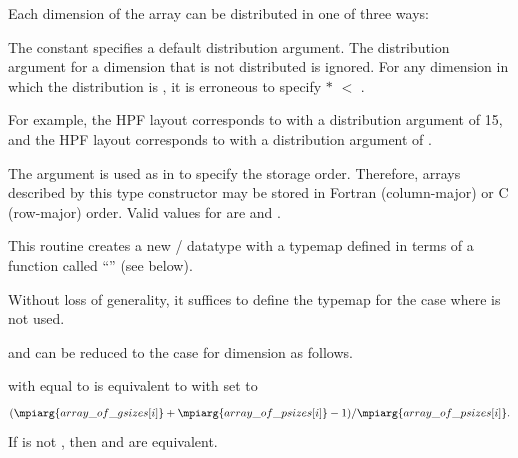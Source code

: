 Each dimension of the array
can be
distributed in one of three ways:
\begin{constlist}
\end{constlist}

The constant  specifies
a default distribution argument.
The distribution argument for a dimension that is not distributed
is ignored.
For any dimension
in which the distribution
is ,
it is erroneous
to specify
 $*$ 
$<$ .

For example, the HPF layout 
corresponds to 
with a distribution argument of 15, and the HPF layout \gb{}
corresponds to
 with a distribution argument of
.

The  argument is used as in  to
specify the storage order.
Therefore, arrays described by this type constructor may be
stored in Fortran (column-major) or C (row-major) order.
Valid values for  are
 and .

This routine creates a new \MPI/ datatype with a typemap defined in
terms of a function called ``'' (see below).

Without loss of generality, it suffices to define the typemap
for the  case where
 is not used.

 and 
can be reduced to the  case
for dimension
as follows.

 with
 equal to 
is equivalent to
with  set to
\[
(\mpiarg{array\_of\_gsizes[i]} + \mpiarg{array\_of\_psizes[i]} - 1)
        / \mpiarg{array\_of\_psizes[i]}.
\]
If  is not ,
then  and 
are equivalent.

